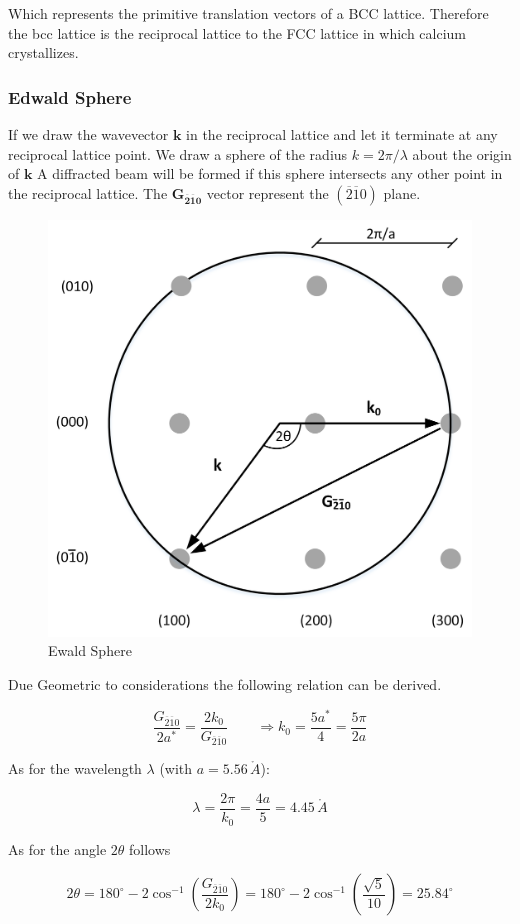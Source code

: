 Which represents the primitive translation vectors of a BCC lattice.
Therefore the bcc lattice is the reciprocal lattice to the FCC lattice
in which calcium crystallizes.


\subsubsection*{Edwald Sphere}

If we draw the wavevector $\mathbf{k}$ in the reciprocal lattice and let it
terminate at any reciprocal lattice point.
We draw a sphere of the radius $k=2\pi/ \lambda$ about the origin of $\mathbf{k}$
A diffracted beam will be formed if this sphere intersects any other point in the 
reciprocal lattice.
The $\mathbf{G_{\overline{2}\overline{1}0}}$ vector represent the 
$(\overline{2}\overline{1}0)$ plane.

\begin{figure}[H]
	\centering
	\includegraphics[width=0.5\linewidth]{Graphics/Chapter2/ewald_sphere.png}
	\caption{Ewald Sphere}
	\label{fig:ewals_sphere}
\end{figure}

Due Geometric to considerations the following relation can be derived.

$$\frac{G_{\overline{2}\overline{1}0}}{2a^*} = \frac{2 k_0}{G_{\overline{2}\overline{1}0}} \qquad \Rightarrow k_0 = \frac{5a^*}{4} = \frac{5\pi}{2a}$$

As for the wavelength $\lambda$  (with $a = 5.56 \, \mathring{A}$):

$$\lambda = \frac{2\pi}{k_0} = \frac{4a}{5} = 4.45  \, \mathring{A}$$

As for the angle $2\theta$ follows

$$2\theta = 180^\circ - 2 \cos^{-1} \left( \frac{G_{\overline{2}\overline{1}0}}{2k_0} \right) =
    180^\circ - 2 \cos^{-1} \left( \frac{\sqrt{5}}{10} \right) = 25.84 ^\circ$$